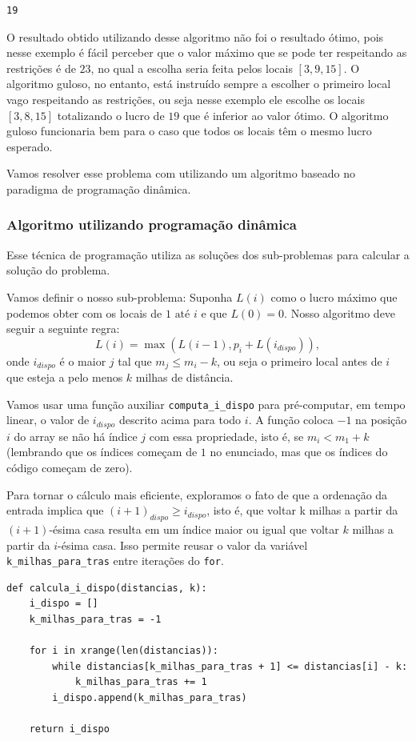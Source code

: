 \documentclass[11pt]{article}
\begin{document}
\begin{verbatim}
19
\end{verbatim}

O resultado obtido utilizando desse algoritmo não foi o resultado
ótimo, pois nesse exemplo é fácil perceber que o valor máximo que se
pode ter respeitando as restrições é de $23$, no qual a escolha seria
feita pelos locais $[3, 9, 15]$. O algoritmo guloso, no entanto, está
instruído sempre a escolher o primeiro local vago respeitando as
restrições, ou seja nesse exemplo ele escolhe os locais $[3, 8, 15]$
totalizando o lucro de $19$ que é inferior ao valor ótimo. O algoritmo
guloso funcionaria bem para o caso que todos os locais têm o mesmo
lucro esperado.

Vamos resolver esse problema com utilizando um algoritmo baseado no
paradigma de programação dinâmica.

\subsubsection{Algoritmo utilizando programação dinâmica}
\label{sec-3-3-2}

Esse técnica de programação utiliza as soluções dos sub-problemas para
calcular a solução do problema.

Vamos definir o nosso sub-problema: Suponha $L(i)$ como o lucro
máximo que podemos obter com os locais de $1 \text{ até } i$ e que
$L(0)=0$. Nosso algoritmo deve seguir a seguinte regra:
\[ L(i) = \max{(L(i-1),p_i + L(i_{dispo}))} ,\]
onde $i_{dispo}$ é o maior $j$ tal que $m_j \leq m_i - k$, ou seja
o primeiro local antes de $i$ que esteja a pelo menos $k$ milhas de
distância.

Vamos usar uma função auxiliar \verb~computa_i_dispo~ para pré-computar, em
tempo linear, o valor de $i_{dispo}$ descrito acima para todo $i$.  A
função coloca $-1$ na posição $i$ do array se não há índice $j$ com
essa propriedade, isto é, se $m_i < m_1 + k$ (lembrando que os índices
começam de $1$ no enunciado, mas que os índices do código começam de
zero).

Para tornar o cálculo mais eficiente, exploramos o fato de que a
ordenação da entrada implica que $(i+1)_{dispo} \geq i_{dispo}$, isto
é, que voltar k milhas a partir da $(i+1)$-ésima casa resulta em um
índice maior ou igual que voltar $k$ milhas a partir da $i$-ésima
casa. Isso permite reusar o valor da variável \verb~k_milhas_para_tras~
entre iterações do \verb~for~.

\begin{verbatim}
def calcula_i_dispo(distancias, k):
    i_dispo = []
    k_milhas_para_tras = -1

    for i in xrange(len(distancias)):
        while distancias[k_milhas_para_tras + 1] <= distancias[i] - k:
            k_milhas_para_tras += 1
        i_dispo.append(k_milhas_para_tras)

    return i_dispo
\end{verbatim}
\end{document}
